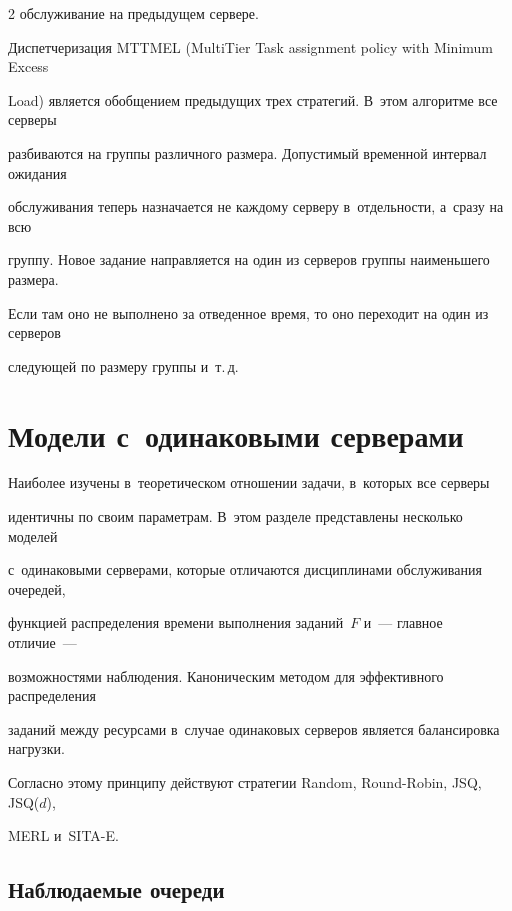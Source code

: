 \begin{multicols}{2}
обслуживание на предыдущем сервере.


    


    Диспетчеризация MTTMEL (MultiTier Task assignment policy with Minimum Excess 


Load) является обобщением предыдущих трех стратегий. В~этом алгоритме все серверы 


разбиваются на группы различного размера. Допустимый временной интервал ожидания 


обслуживания теперь назначается не каж\-до\-му серверу в~отдельности, а~сразу на всю 


группу. Новое задание направляется на один из серверов группы наименьшего размера. 


Если там оно не выполнено за отведенное время, то оно переходит на один из серверов 


следующей по размеру группы и~т.\,д.





\section{Модели с~одинаковыми серверами}





    Наиболее изучены в~теоретическом отношении задачи, в~которых все серверы 


идентичны по своим параметрам. В~этом разделе представлены несколько моделей 


с~одинаковыми серверами, которые отличаются дисциплинами обслуживания очередей, 


функцией распределения времени выполнения заданий~$F$ и~--- главное отличие~--- 


возможностями наблюдения. Каноническим методом для эффективного распределения 


заданий между ресурсами в~случае одинаковых серверов является балансировка нагрузки. 


Согласно этому принципу действуют стратегии Random, Round-Robin, JSQ, JSQ($d$), 


MERL и~SITA-E.





\subsection{Наблюдаемые очереди}



\end{multicols}
